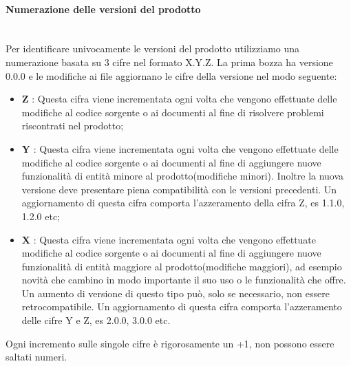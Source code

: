 		\paragraph*{Numerazione delle versioni del prodotto} \mbox{}\\ [1mm]
		Per identificare univocamente le versioni del prodotto utilizziamo una numerazione basata su 3 cifre nel formato X.Y.Z. La prima bozza ha versione 0.0.0 e le modifiche ai file aggiornano le cifre della versione nel modo seguente:
		\begin{itemize}
			\item \textbf{Z} : Questa cifra viene incrementata ogni volta che vengono effettuate delle modifiche al codice sorgente o ai documenti al fine di risolvere problemi riscontrati nel prodotto\glo;
			\item \textbf{Y} : Questa cifra viene incrementata ogni volta che vengono effettuate delle modifiche al codice sorgente o ai documenti al fine di aggiungere nuove funzionalità di entità minore al prodotto\glo(modifiche minori\glo). Inoltre la nuova versione deve presentare piena compatibilità con le versioni precedenti. Un aggiornamento di questa cifra comporta l'azzeramento della cifra Z, es 1.1.0, 1.2.0 etc;
			\item \textbf{X} : Questa cifra viene incrementata ogni volta che vengono effettuate modifiche al codice sorgente o ai documenti al fine di aggiungere nuove funzionalità di entità maggiore al prodotto\glo(modifiche maggiori\glo), ad esempio novità che cambino in modo importante il suo uso o le funzionalità che offre. Un aumento di versione di questo tipo può, solo se necessario, non essere retrocompatibile. Un aggiornamento di questa cifra comporta l'azzeramento delle cifre Y e Z, es 2.0.0, 3.0.0 etc.
		\end{itemize}
		Ogni incremento sulle singole cifre è rigorosamente un +1, non possono essere saltati numeri.
		
